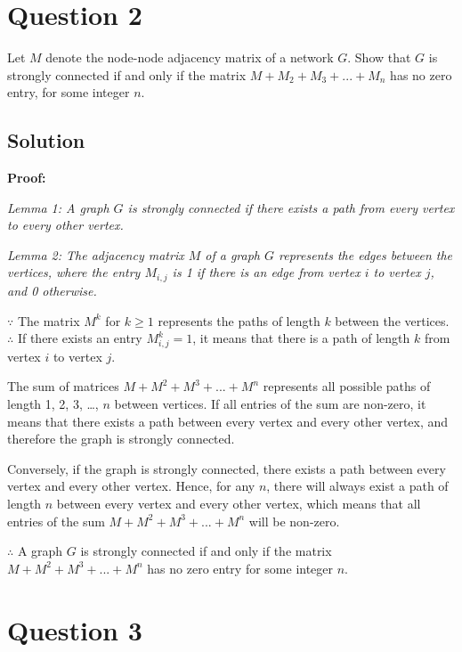 \documentclass[11pt]{article}
\begin{document}
    \hypertarget{question-2}{%
\section{Question 2}\label{question-2}}

Let \(M\) denote the node-node adjacency matrix of a network \(G\). Show
that \(G\) is strongly connected if and only if the matrix
\(M+ M_2 + M_3 + ... + M_n\) has no zero entry, for some integer \(n\).

\hypertarget{solution}{%
\subsection{Solution}\label{solution}}

\textbf{Proof:}

\emph{Lemma 1: A graph \(G\) is strongly connected if there exists a
path from every vertex to every other vertex.}

\emph{Lemma 2: The adjacency matrix \(M\) of a graph \(G\) represents
the edges between the vertices, where the entry \(M_{i,j}\) is 1 if
there is an edge from vertex \(i\) to vertex \(j\), and 0 otherwise.}

\(\because\) The matrix \(M^k\) for \(k\geq 1\) represents the paths of
length \(k\) between the vertices. \(\therefore\) If there exists an
entry \(M^k_{i,j} = 1\), it means that there is a path of length \(k\)
from vertex \(i\) to vertex \(j\).

The sum of matrices \(M + M^2 + M^3 + ... + M^n\) represents all
possible paths of length 1, 2, 3, \ldots, \(n\) between vertices. If all
entries of the sum are non-zero, it means that there exists a path
between every vertex and every other vertex, and therefore the graph is
strongly connected.

Conversely, if the graph is strongly connected, there exists a path
between every vertex and every other vertex. Hence, for any \(n\), there
will always exist a path of length \(n\) between every vertex and every
other vertex, which means that all entries of the sum
\(M + M^2 + M^3 + ... + M^n\) will be non-zero.

\(\therefore\) A graph \(G\) is strongly connected if and only if the
matrix \(M + M^2 + M^3 + ... + M^n\) has no zero entry for some integer
\(n\).

    \hypertarget{question-3}{%
\section{Question 3}\label{question-3}}
\end{document}
